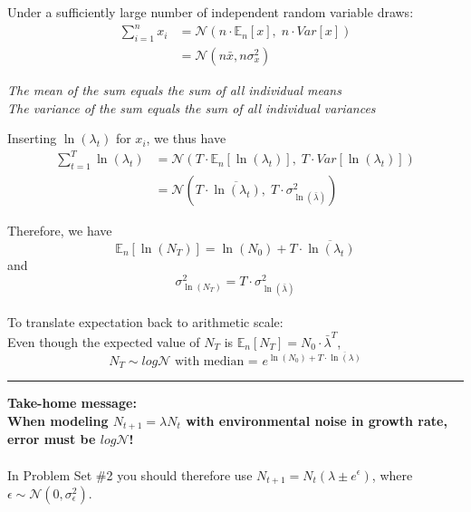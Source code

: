 \documentclass{article}
\begin{document}
Under a sufficiently large number of independent random variable draws:
\begin{align*}
	\boxed{\sum_{i=1}^n x_i} & = \mathcal{N}(n\cdot \mathbb{E}_n[x] , \; n\cdot Var[x])\\
	& = \mathcal{N}(n \bar{x}, n \sigma_{x}^2)
\end{align*}

\begin{center}
\emph{The mean of the sum equals the sum of all individual means}\\
\emph{The variance of the sum equals the sum of all individual variances}\\
\end{center}
Inserting $\ln (\lambda_t)$ for $x_i$, we thus have
\begin{align*}
	\sum_{t=1}^T \ln (\lambda_t) & =  \mathcal{N}(T\cdot \mathbb{E}_n[\ln(\lambda_t)] , \; T\cdot Var[\ln(\lambda_t)])\\
	& = \mathcal{N}(T\cdot \overline{\ln(\lambda_t)},\; T\cdot\sigma_{\ln (\bar{\lambda})}^2)
\end{align*}

Therefore, we have
\begin{equation*}
	\mathbb{E}_n[\ln(N_T)]=\ln(N_0)+ T \cdot \overline{\ln(\lambda_t)}
\end{equation*}
and
\begin{equation*}
\sigma_{\ln (N_T)}^2 = T\cdot \sigma_{\ln(\bar{\lambda})}^2
\end{equation*}
\\
To translate expectation back to arithmetic scale:\\
Even though the expected value of $N_T$ is $\mathbb{E}_n[N_T]= N_0 \cdot \bar{\lambda}^T$,
\begin{equation*}
	N_T \sim log\mathcal{N} \text{ with median = } e^{\ln(N_0)+T\cdot \overline{\ln(\lambda)}}
\end{equation*}

\rule[0.5ex]{\linewidth}{1pt}

\textbf{Take-home message:}\\
\textbf{When modeling $N_{t+1}=\lambda N_t$ with environmental noise in growth rate, error must be $log\mathcal{N}$!}\\
\\
In Problem Set \#2 you should therefore use $N_{t+1}=N_t (\lambda \pm e^\epsilon)$, where $\epsilon \sim \mathcal{N}(0,\sigma_\epsilon^2)$.\\

\pagebreak
\end{document}
